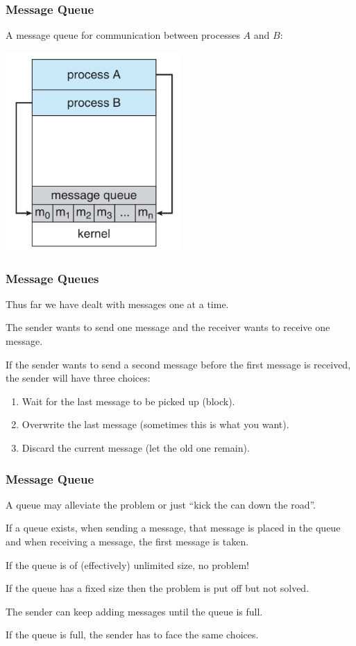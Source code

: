 \begin{frame}
	\frametitle{Message Queue}
	A message queue for communication between processes $A$ and $B$:
	\begin{center}
		\includegraphics[width=0.5\textwidth]{images/message-passing.png}
	\end{center}

\end{frame}

\begin{frame}
	\frametitle{Message Queues}

	Thus far we have dealt with messages one at a time.

	The sender wants to send one message and the receiver wants to receive one message.

	If the sender wants to send a second message before the first message is received, the sender will have three choices:

	\begin{enumerate}
		\item Wait for the last message to be picked up (block).
		\item Overwrite the last message (sometimes this is what you want).
		\item Discard the current message (let the old one remain).
	\end{enumerate}


\end{frame}

\begin{frame}
	\frametitle{Message Queue}

	A queue may alleviate the problem or just ``kick the can down the road''.

	If a queue exists, when sending a message, that message is placed in the queue and when receiving a message, the first message is taken.

	If the queue is of (effectively) unlimited size, no problem!

	If the queue has a fixed size then the problem is put off but not solved.

	The sender can keep adding messages until the queue is full.

	If the queue is full, the sender has to face the same choices.

\end{frame}


